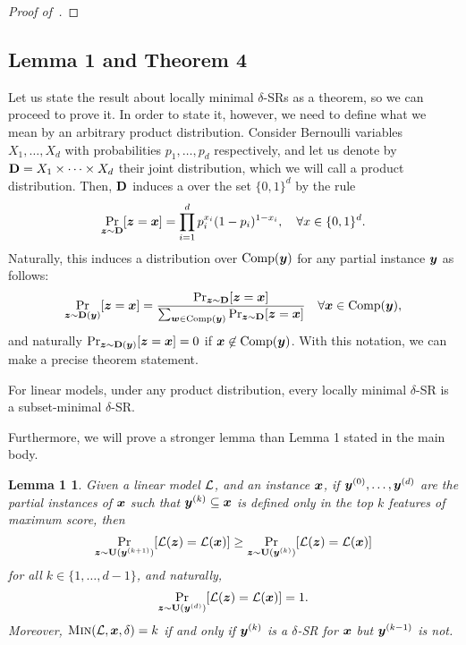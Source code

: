 \begin{proof}[Proof of~]
\end{proof}




\subsection{Lemma 1 and Theorem 4}
Let us state the result about locally minimal $\delta$-SRs as a theorem, so we can proceed to prove it. 
In order to state it, however, we need to define what we mean by an arbitrary product distribution. Consider Bernoulli variables $X_1, \ldots, X_d$ with probabilities $p_1, \ldots, p_d$ respectively, and let us denote by $\mathbf{D} = X_1 \times \cdots \times X_d$ their joint distribution, which we will call a product distribution. Then, $\mathbf{D}$ induces a over the set $\{0, 1\}^d$ by the rule
\[ 
    \Pr_{{\bm{z}} \sim \mathbf{D}}[{\bm{z}} = {\bm{x}}] = \prod_{i=1}^d p_i^{x_i} (1-p_i)^{1-x_i}, \quad \forall x \in \{0, 1\}^d.
\]
Naturally, this induces a distribution over $\operatorname{Comp}({\bm{y}})$ for any partial instance ${\bm{y}}$ as follows:
\[ 
    \Pr_{{\bm{z}} \sim \mathbf{D}({\bm{y}})}[{\bm{z}} = {\bm{x}}] =
        \frac{\Pr_{{\bm{z}} \sim \mathbf{D}}[{\bm{z}} = {\bm{x}}]}{\sum_{{\bm{w}} \in \operatorname{Comp}({\bm{y}})} \Pr_{{\bm{z}} \sim \mathbf{D}}[{\bm{z}} = {\bm{x}}]} \quad \forall {\bm{x}} \in \operatorname{Comp}({\bm{y}}),
\]
and naturally $\Pr_{{\bm{z}} \sim \mathbf{D}({\bm{y}})}[{\bm{z}} = {\bm{x}}] = 0$ if ${\bm{x}} \not\in \operatorname{Comp}({\bm{y}})$.
With this notation, we can make a precise theorem statement.
\begin{theorem}\label{thm:locally-minimal}
    For linear models, under any product distribution, every locally minimal $\delta$-SR is a subset-minimal $\delta$-SR.
\end{theorem}

Furthermore, we will prove a stronger lemma than Lemma 1 stated in the main body.

\newtheorem*{theorem8}{Lemma 1}
\begin{theorem8} %
    Given a linear model $\mathcal{L}$, and an instance ${\bm{x}}$, if ${\bm{y}}^{(0)}, \ldots, {\bm{y}}^{(d)}$ are the partial instances of ${\bm{x}}$ such that ${\bm{y}}^{(k)} \subseteq {\bm{x}}$ is defined only in the top $k$ features of maximum score, then
    \[ 
        \Pr_{{\bm{z}} \sim \mathbf{U}({\bm{y}}^{(k+1)})}[\mathcal{L}({\bm{z}}) = \mathcal{L}({\bm{x}})] \geq \Pr_{{\bm{z}} \sim \mathbf{U}({\bm{y}}^{(k)})}[\mathcal{L}({\bm{z}}) = \mathcal{L}({\bm{x}})]
    \]
    for all $k \in \{1, \ldots, d-1\}$, and naturally, 
    \[ 
    \Pr_{{\bm{z}} \sim \mathbf{U}({\bm{y}}^{(d)})}[\mathcal{L}({\bm{z}}) = \mathcal{L}({\bm{x}})] = 1.
    \]
    Moreover, $\operatorname{\textsc{Min}}(\mathcal{L}, {\bm{x}}, \delta) = k$ if and only if ${\bm{y}}^{(k)}$ is a $\delta$-SR for ${\bm{x}}$ but ${\bm{y}}^{(k-1)}$ is not. 
 \end{theorem8}


